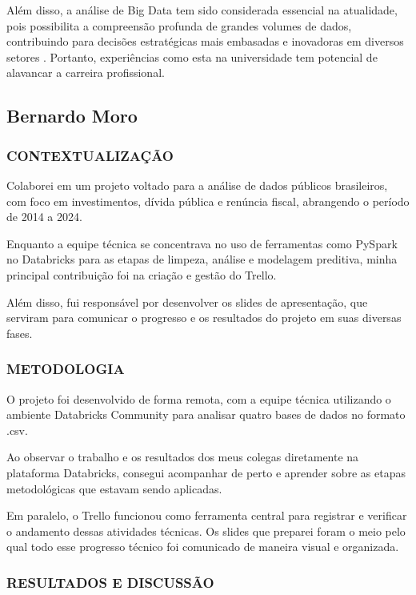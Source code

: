 \documentclass{article}
\begin{document}
Além disso, a análise de Big Data tem sido considerada essencial na atualidade, pois possibilita a compreensão profunda de grandes volumes de dados, contribuindo para decisões estratégicas mais embasadas e inovadoras em diversos setores \cite{MayerSchönberger2013}. Portanto, experiências como esta na universidade tem potencial de alavancar a carreira profissional.

\subsection{Bernardo Moro}

\subsubsection{CONTEXTUALIZAÇÃO}

Colaborei em um projeto voltado para a análise de dados públicos brasileiros, com foco em investimentos, dívida pública e renúncia fiscal, abrangendo o período de 2014 a 2024. 

Enquanto a equipe técnica se concentrava no uso de ferramentas como PySpark no Databricks para as etapas de limpeza, análise e modelagem preditiva, minha principal contribuição foi na criação e gestão do Trello.

Além disso, fui responsável por desenvolver os slides de apresentação, que serviram para comunicar o progresso e os resultados do projeto em suas diversas fases.

\subsubsection{METODOLOGIA}

O projeto foi desenvolvido de forma remota, com a equipe técnica utilizando o ambiente Databricks Community para analisar quatro bases de dados no formato .csv. 

Ao observar o trabalho e os resultados dos meus colegas diretamente na plataforma Databricks, consegui acompanhar de perto e aprender sobre as etapas metodológicas que estavam sendo aplicadas.

Em paralelo, o Trello funcionou como ferramenta central para registrar e verificar o andamento dessas atividades técnicas. Os slides que preparei foram o meio pelo qual todo esse progresso técnico foi comunicado de maneira visual e organizada.

\subsubsection{RESULTADOS E DISCUSSÃO}
\end{document}
